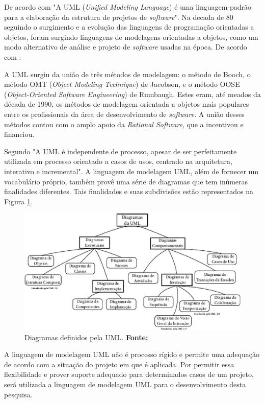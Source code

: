 		
	\par De acordo com  "A UML (\textit{Unified Modeling
Language}) é uma linguagem-padrão para a elaboração da estrutura de projetos
de \textit{software}". Na decada de 80 seguindo o surgimento e a evolução das
linguagens de programação orientadas a objetos, foram surgindo linguagens de
modelagens orientadas a objetos, como um modo alternativo de análise e projeto
de \textit{software} usadas na época. De acordo com
:
	\begin{citacao}
		A UML surgiu da união de três métodos de modelagem: o método de Booch, o
		método OMT (\textit{Object Modeling Technique}) de Jacobson, e o método OOSE
		(\textit{Object-Oriented Software Engineering}) de Rumbaugh. Estes eram, até
		meados da década de 1990, os métodos de modelagem orientada a objetos mais
		populares entre os profissionais da área de desenvolvimento de
		\textit{software}. A união desses métodos contou com o amplo apoio da
		\textit{Rational Software}, que a incentivou e financiou.
	\end{citacao}

	\par Segundo  "A UML é independente de processo,
apesar de ser perfeitamente utilizada em processo orientado a casos de usos,
centrado na arquitetura, interativo e incremental". A linguagem de modelagem
UML, além de fornecer um vocabulário próprio, também provê uma série de
diagramas que tem inúmeras finalidades diferentes. Tais finalidades e suas
subdivisões estão representados na Figura \ref{fig:qt4}.
		
	\begin{figure}[h!]
		\centerline{\includegraphics[scale=1]{./imagens/1_q_teorico/qt4.png}}
		\caption[Principais Diagramas definidos pela UML.]{Diagramas definidos pela
		UML. \textbf{Fonte:}}
		\label{fig:qt4}
	\end{figure}
	\pagebreak
	
	\par A linguagem de modelagem UML não é processo rígido e permite uma
adequação de acordo com a situação do projeto em que é aplicada. Por permitir
essa flexibilidade e prover suporte adequado para determinados casos de um
projeto, será utilizada a linguagem de modelagem UML  para o desenvolvimento
desta pesquisa.